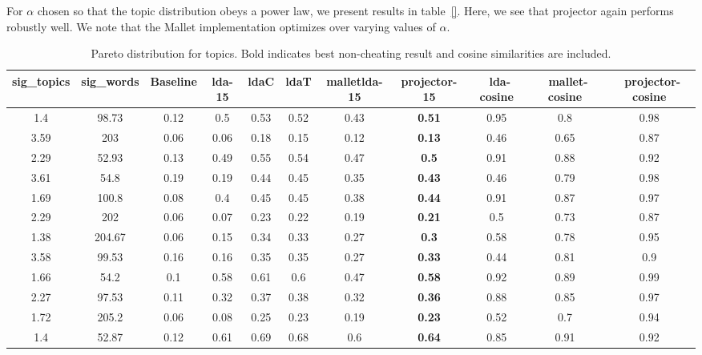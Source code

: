 For $\alpha$ chosen so that the topic distribution obeys a power
law, we present results in table~\ref{}. Here, we see that
projector again performs robustly well.  We note that 
the Mallet implementation optimizes over varying values of
$\alpha$. 

\begin{table}
{\tiny
\begin{tabular}{|c|c|c|c|c|c|c|c|c|c|c|}
\hline 
sig\_topics &sig\_words &Baseline &lda-15 &ldaC &ldaT &malletlda-15 &projector-15 &~lda-cosine &~mallet-cosine &~projector-cosine \\
 \hline 
1.4  &98.73  &{0.12}
  &{0.5}
  &{0.53}
  &{0.52}
  &{0.43}
  &\textbf{0.51}
  &0.95  &0.8  &0.98  \\
 \hline 
3.59  &203  &{0.06}
  &{0.06}
  &{0.18}
  &{0.15}
  &{0.12}
  &\textbf{0.13}
  &0.46  &0.65  &0.87  \\
 \hline 
2.29  &52.93  &{0.13}
  &{0.49}
  &{0.55}
  &{0.54}
  &{0.47}
  &\textbf{0.5}
  &0.91  &0.88  &0.92  \\
 \hline 
3.61  &54.8  &{0.19}
  &{0.19}
  &{0.44}
  &{0.45}
  &{0.35}
  &\textbf{0.43}
  &0.46  &0.79  &0.98  \\
 \hline 
1.69  &100.8  &{0.08}
  &{0.4}
  &{0.45}
  &{0.45}
  &{0.38}
  &\textbf{0.44}
  &0.91  &0.87  &0.97  \\
 \hline 
2.29  &202  &{0.06}
  &{0.07}
  &{0.23}
  &{0.22}
  &{0.19}
  &\textbf{0.21}
  &0.5  &0.73  &0.87  \\
 \hline 
1.38  &204.67  &{0.06}
  &{0.15}
  &{0.34}
  &{0.33}
  &{0.27}
  &\textbf{0.3}
  &0.58  &0.78  &0.95  \\
 \hline 
3.58  &99.53  &{0.16}
  &{0.16}
  &{0.35}
  &{0.35}
  &{0.27}
  &\textbf{0.33}
  &0.44  &0.81  &0.9  \\
 \hline 
1.66  &54.2  &{0.1}
  &{0.58}
  &{0.61}
  &{0.6}
  &{0.47}
  &\textbf{0.58}
  &0.92  &0.89  &0.99  \\
 \hline 
2.27  &97.53  &{0.11}
  &{0.32}
  &{0.37}
  &{0.38}
  &{0.32}
  &\textbf{0.36}
  &0.88  &0.85  &0.97  \\
 \hline 
1.72  &205.2  &{0.06}
  &{0.08}
  &{0.25}
  &{0.23}
  &{0.19}
  &\textbf{0.23}
  &0.52  &0.7  &0.94  \\
 \hline 
1.4  &52.87  &{0.12}
  &{0.61}
  &{0.69}
  &{0.68}
  &{0.6}
  &\textbf{0.64}
  &0.85  &0.91  &0.92  \\
 \hline 

\end{tabular}
}

\caption{Pareto distribution for topics. Bold indicates best non-cheating result
and cosine similarities are included.}
\label{tab:pareto}
\end{table}

